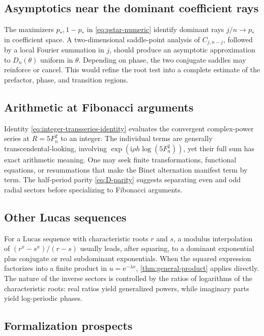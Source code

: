 \documentclass[11pt,oneside]{article}
\numberwithin{equation}{section}
\theoremstyle{plain}
\theoremstyle{definition}
\theoremstyle{remark}
\newcommand{\e}{\mathrm e}
\newcommand{\ii}{\mathrm i}
\begin{document}
\subsection{Asymptotics near the dominant coefficient rays}

The maximizers \(p_*,1-p_*\) in \cref{eq:pstar-numeric} identify dominant
rays \(j/n\to p_*\) in coefficient space.  A two-dimensional saddle-point
analysis of \(C_{j,n-j}\), followed by a local Fourier summation in \(j\),
should produce an asymptotic approximation to \(D_n(\theta)\) uniform in
\(\theta\).  Depending on phase, the two conjugate saddles may reinforce or
cancel.  This would refine the root test into a complete estimate of the
prefactor, phase, and transition regions.

\subsection{Arithmetic at Fibonacci arguments}

Identity \cref{eq:integer-transseries-identity} evaluates the convergent
complex-power series at \(R=5F_n^2\) to an integer.  The individual terms
are generally transcendental-looking, involving
\(
 \exp(\ii\rho h\log(5F_n^2))
\), yet their full sum has exact arithmetic meaning.  One may seek finite
transformations, functional equations, or resummations that make the Binet
alternation manifest term by term.  The half-period parity
\cref{eq:D-parity} suggests separating even and odd radial sectors before
specializing to Fibonacci arguments.

\subsection{Other Lucas sequences}

For a Lucas sequence with characteristic roots \(r\) and \(s\), a modulus
interpolation of
\(
 (r^x-s^x)/(r-s)
\)
usually leads, after squaring, to a dominant exponential plus conjugate or
real subdominant exponentials.  When the squared expression factorizes into
a finite product in \(u=\e^{-\lambda x}\),
\cref{thm:general-product} applies directly.  The nature of the inverse
sectors is controlled by the ratios of logarithms of the characteristic
roots: real ratios yield generalized powers, while imaginary parts yield
log-periodic phases.

\subsection{Formalization prospects}
\end{document}
